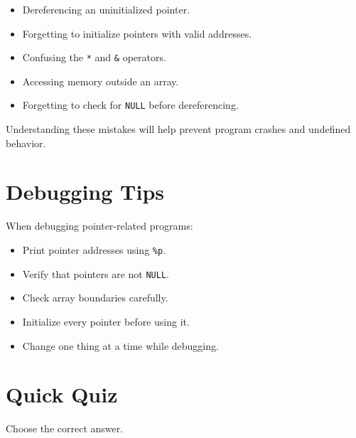 \documentclass[12pt,openany]{book}
\begin{document}
\begin{itemize}
    \item Dereferencing an uninitialized pointer.
    \item Forgetting to initialize pointers with valid addresses.
    \item Confusing the \texttt{*} and \texttt{\&} operators.
    \item Accessing memory outside an array.
    \item Forgetting to check for \texttt{NULL} before dereferencing.
\end{itemize}

Understanding these mistakes will help prevent program crashes and undefined behavior.

\section{Debugging Tips}

When debugging pointer-related programs:

\begin{itemize}
    \item Print pointer addresses using \texttt{\%p}.
    \item Verify that pointers are not \texttt{NULL}.
    \item Check array boundaries carefully.
    \item Initialize every pointer before using it.
    \item Change one thing at a time while debugging.
\end{itemize}

\section{Quick Quiz}

Choose the correct answer.
\end{document}

